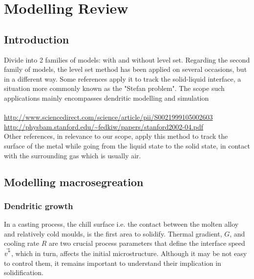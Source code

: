 \chapter{Modelling Review}
\begin{nolinkcolors} 
\minitoc
\end{nolinkcolors}
\newpage

\section{Introduction}
Divide into 2 families of models: with and without level set. Regarding the second family of models,
the level set method has been applied on several occasions, but in a different way. Some references
apply it to track the solid-liquid interface, a situation more commonly known as the "Stefan problem".
The scope such applications mainly encompasses dendritic modelling and simulation \\
 \\
\url{http://www.sciencedirect.com/science/article/pii/S0021999105002603} \\
\url{http://physbam.stanford.edu/~fedkiw/papers/stanford2002-04.pdf} \\
Other references, in relevance to our scope, apply this method to track the surface of the metal
while going from the liquid state to the solid state, in contact with the surrounding gas which is usually air.
\section{Modelling macrosegreation}
\subsection{Dendritic growth}
In a casting process, the chill surface i.e. the contact between the molten alloy and relatively cold moulds, is the first area to solidify. 
Thermal gradient, $G$, and cooling rate $R$ are two crucial process parameters that define the interface speed $\vec{v^\text{*}}$, which in turn,
affects the initial microstructure. Although it may be not easy to control them, it remains important to understand their implication in solidification.

